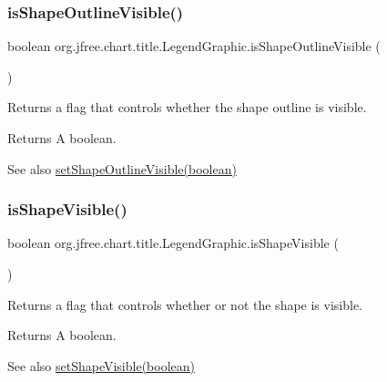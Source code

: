 \subsubsection{\texorpdfstring{is\+Shape\+Outline\+Visible()}{isShapeOutlineVisible()}}
{\footnotesize\ttfamily boolean org.\+jfree.\+chart.\+title.\+Legend\+Graphic.\+is\+Shape\+Outline\+Visible (\begin{DoxyParamCaption}{ }\end{DoxyParamCaption})}

Returns a flag that controls whether the shape outline is visible.

\begin{DoxyReturn}{Returns}
A boolean.
\end{DoxyReturn}
\begin{DoxySeeAlso}{See also}
\mbox{\hyperlink{classorg_1_1jfree_1_1chart_1_1title_1_1_legend_graphic_a779afaf78a0072d77a1655ee25123dd3}{set\+Shape\+Outline\+Visible(boolean)}} 
\end{DoxySeeAlso}
\mbox{\label{classorg_1_1jfree_1_1chart_1_1title_1_1_legend_graphic_adce25f6b685e2135236b4cdf0e555a43}} 
\subsubsection{\texorpdfstring{is\+Shape\+Visible()}{isShapeVisible()}}
{\footnotesize\ttfamily boolean org.\+jfree.\+chart.\+title.\+Legend\+Graphic.\+is\+Shape\+Visible (\begin{DoxyParamCaption}{ }\end{DoxyParamCaption})}

Returns a flag that controls whether or not the shape is visible.

\begin{DoxyReturn}{Returns}
A boolean.
\end{DoxyReturn}
\begin{DoxySeeAlso}{See also}
\mbox{\hyperlink{classorg_1_1jfree_1_1chart_1_1title_1_1_legend_graphic_a9e9b25b9ffb71d4945bf4f873b74bb26}{set\+Shape\+Visible(boolean)}} 
\end{DoxySeeAlso}
\mbox{\label{classorg_1_1jfree_1_1chart_1_1title_1_1_legend_graphic_a3c8d58ed6cc6ea596e53f3ae782ae84a}} 
